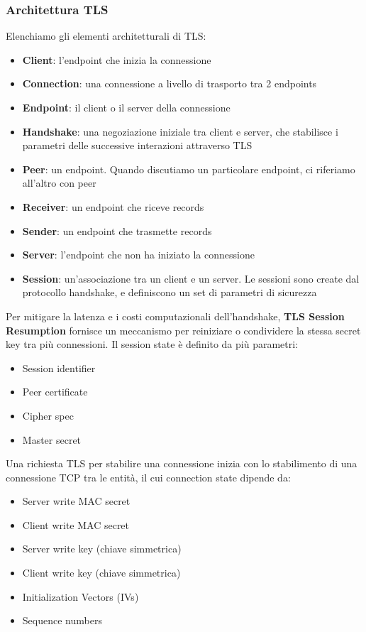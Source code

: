\documentclass[11pt]{article}
\begin{document}
\subsubsection{Architettura TLS}
Elenchiamo gli elementi architetturali di TLS:
\begin{itemize}
    \item \textbf{Client}: l'endpoint che inizia la connessione 
    \item \textbf{Connection}: una connessione a livello di trasporto tra 2 endpoints
    \item \textbf{Endpoint}: il client o il server della connessione
    \item \textbf{Handshake}: una negoziazione iniziale tra client e server, che stabilisce i parametri delle successive interazioni attraverso TLS
    \item \textbf{Peer}: un endpoint. Quando discutiamo un particolare endpoint, ci riferiamo all'altro con peer 
    \item \textbf{Receiver}: un endpoint che riceve records
    \item \textbf{Sender}: un endpoint che trasmette records 
    \item \textbf{Server}: l'endpoint che non ha iniziato la connessione 
    \item \textbf{Session}: un'associazione tra un client e un server. Le sessioni sono create dal protocollo handshake, e definiscono un set di parametri di sicurezza 
\end{itemize}
Per mitigare la latenza e i costi computazionali dell'handshake, \textbf{TLS Session Resumption} fornisce un meccanismo per reiniziare o condividere la stessa secret key tra più connessioni. Il session state è definito da più parametri:
\begin{itemize}
    \item Session identifier 
    \item Peer certificate 
    \item Cipher spec 
    \item Master secret
\end{itemize}
Una richiesta TLS per stabilire una connessione inizia con lo stabilimento di una connessione TCP tra le entità, il cui connection state dipende da:
\begin{itemize}
    \item Server write MAC secret
    \item Client write MAC secret 
    \item Server write key (chiave simmetrica)
    \item Client write key (chiave simmetrica)
    \item Initialization Vectors (IVs)
    \item Sequence numbers
\end{itemize}
\end{document}
